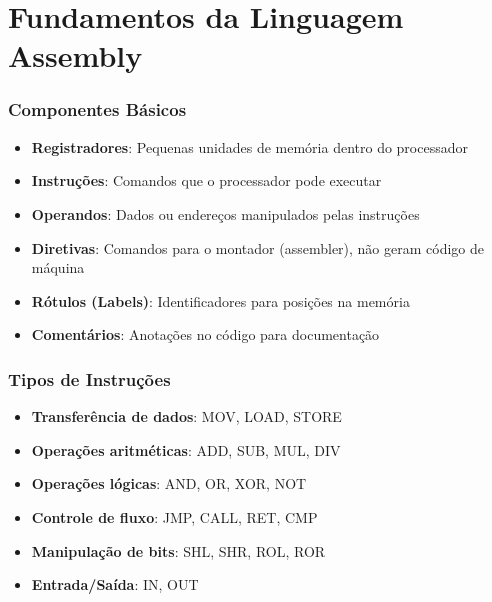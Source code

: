 \documentclass[11pt]{beamer}
\begin{document}
\section{Fundamentos da Linguagem Assembly}

\begin{frame}
\frametitle{Componentes Básicos}

\begin{itemize}
    \item \textbf{Registradores}: Pequenas unidades de memória dentro do processador
    \item \textbf{Instruções}: Comandos que o processador pode executar
    \item \textbf{Operandos}: Dados ou endereços manipulados pelas instruções
    \item \textbf{Diretivas}: Comandos para o montador (assembler), não geram código de máquina
    \item \textbf{Rótulos (Labels)}: Identificadores para posições na memória
    \item \textbf{Comentários}: Anotações no código para documentação
\end{itemize}

\end{frame}

\begin{frame}
\frametitle{Tipos de Instruções}

\begin{itemize}
    \item \textbf{Transferência de dados}: MOV, LOAD, STORE
    \item \textbf{Operações aritméticas}: ADD, SUB, MUL, DIV
    \item \textbf{Operações lógicas}: AND, OR, XOR, NOT
    \item \textbf{Controle de fluxo}: JMP, CALL, RET, CMP
    \item \textbf{Manipulação de bits}: SHL, SHR, ROL, ROR
    \item \textbf{Entrada/Saída}: IN, OUT
\end{itemize}

\end{frame}
\end{document}
